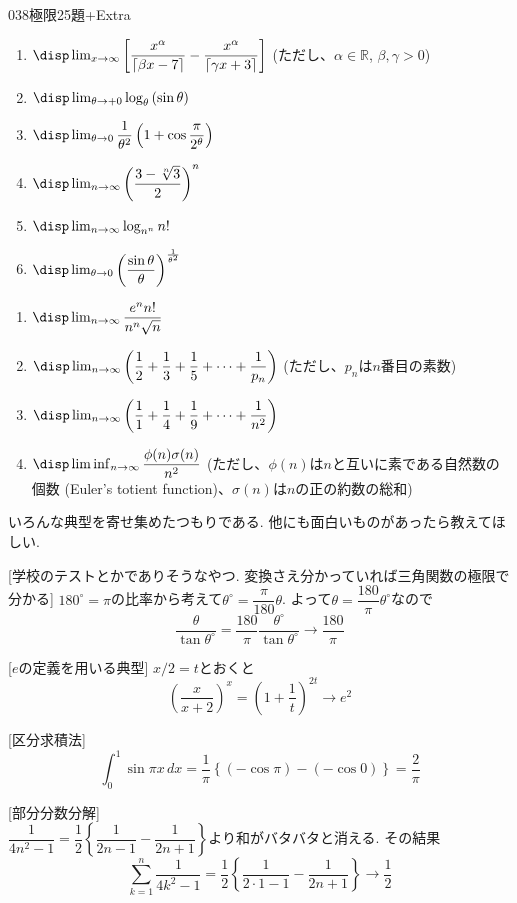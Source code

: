 \begin{thm}{038}{}{極限25題+Extra}
\begin{enumerate}
  \item $\disp \lim_{x\to\infty} \left[\dfrac{x^\alpha}{\left\lceil\beta x-7\right\rceil}-\dfrac{x^\alpha}{\left\lceil\gamma x+3\right\rceil}\right]$ (ただし、$\alpha\in\mathbb{R}$, $\beta, \gamma>0$)
  \item $\disp \lim_{\theta\to +0} \log_\theta \left(\sin\theta\right)$
  \item $\disp \lim_{\theta\to 0} \dfrac{1}{\theta^2}\left(1+\cos\dfrac{\pi}{2^\theta}\right)$
  \item $\disp \lim_{n\to\infty} \left(\dfrac{3-\sqrt[n]{3}}{2}\right)^n$
  \item $\disp \lim_{n\to\infty} \log_{n^n}n!$
  \item $\disp \lim_{\theta\to 0} \left(\dfrac{\sin\theta}{\theta}\right)^{\frac{1}{\theta^2}}$
 \end{enumerate}
 \begin{enumerate}
  \renewcommand{\labelenumi}{Ex\arabic{enumi}}
  \item $\disp \lim_{n\to\infty} \dfrac{e^nn!}{n^n\sqrt{n}}$
  \item $\disp \lim_{n\to\infty} \left(\dfrac{1}{2}+\dfrac{1}{3}+\dfrac{1}{5}+\cdots+\dfrac{1}{p_n}\right)$ (ただし、$p_n$は$n$番目の素数)
  \item $\disp \lim_{n\to\infty} \left(\dfrac{1}{1}+\dfrac{1}{4}+\dfrac{1}{9}+\cdots+\dfrac{1}{n^2}\right)$
  \item $\disp \liminf_{n\to\infty} \dfrac{\phi(n)\sigma(n)}{n^2}$ (ただし、$\phi(n)$は$n$と互いに素である自然数の個数 (Euler's totient function)、$\sigma(n)$は$n$の正の約数の総和)
 \end{enumerate}
\end{thm}
いろんな典型を寄せ集めたつもりである. 他にも面白いものがあったら教えてほしい. 

 [学校のテストとかでありそうなやつ. 変換さえ分かっていれば三角関数の極限で分かる]  $180^{\circ} = \pi$の比率から考えて$\theta^{\circ} = \dfrac{\pi}{180}\theta$. よって$\theta = \dfrac{180}{\pi}\theta^{\circ}$なので
\[\dfrac{\theta}{\tan{\theta^{\circ}}} = \dfrac{180}{\pi} \dfrac{\theta^{\circ}}{\tan{\theta^{\circ}}} \to \dfrac{180}{\pi}\]

 [$e$の定義を用いる典型]  $x/2 = t$とおくと
\[\left(\dfrac{x}{x+2}\right)^x = (1+\dfrac{1}{t})^{2t} \to e^2\]

 [区分求積法]
\[\int_{0}^{1} \sin{\pi x}\, dx = \dfrac{1}{\pi}\left\{ (-\cos{\pi}) - (-\cos{0})  \right\} = \dfrac{2}{\pi}\]

 [部分分数分解] \\$\dfrac{1}{4n^2 - 1} = \dfrac{1}{2}\left\{ \dfrac{1}{2n-1} - \dfrac{1}{2n+1}\right\}$より和がバタバタと消える. その結果
\[\sum_{k=1}^{n} \dfrac{1}{4k^2-1} = \dfrac{1}{2} \left\{ \dfrac{1}{2\cdot 1-1} - \dfrac{1}{2n + 1}\right\} \to \dfrac{1}{2}\]

